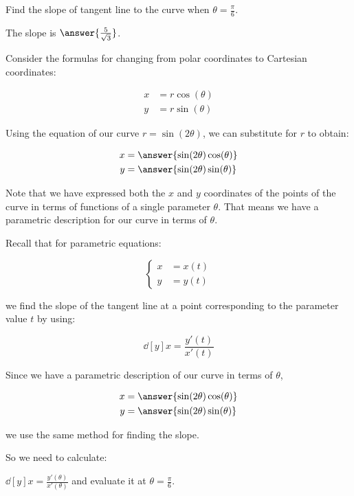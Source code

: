 \documentclass{ximera}
\begin{document}
\begin{exercise}
\begin{hint}
\end{hint}

\begin{exercise}

Find the slope of tangent line to the curve when $\theta=\frac{\pi}{6}$. 

The slope is $\answer{ \frac{5}{\sqrt{3}} }$.

\begin{hint}

Consider the formulas for changing from polar coordinates to Cartesian coordinates:

\begin{align*}
x&=r\cos(\theta) \\
y&=r\sin(\theta)
\end{align*}

Using the equation of our curve $r=\sin(2\theta)$, we can substitute for $r$ to obtain:

\begin{align*}
x&=\answer{\sin(2\theta)\cos(\theta)} \\
y&=\answer{\sin(2\theta)\sin(\theta) }
\end{align*}

Note that we have expressed both the $x$ and $y$ coordinates of the points of the curve in terms of functions of a single parameter $\theta$. That means we have a parametric description for our curve in terms of $\theta$. 

Recall that for parametric equations: 

\[
\begin{cases}
x&=x(t) \\
y&=y(t)
\end{cases}
\]

we find the slope of the tangent line at a point corresponding to the parameter value $t$ by using: 

\[
\dd[y]{x}=\frac{ y'(t)}{x'(t)}
\]

Since we have a parametric description of our curve in terms of $\theta$, 

\begin{align*}
x&=\answer{\sin(2\theta)\cos(\theta)} \\
y&=\answer{\sin(2\theta)\sin(\theta) }
\end{align*}

we use the same method for finding the slope. 

So we need to calculate:

$\dd[y]{x}=\frac{ y'(\theta)}{x'(\theta)}$ and evaluate it at $\theta=\frac{\pi}{6}$. 


\end{hint}
\end{exercise}
\end{exercise}
\end{document}
